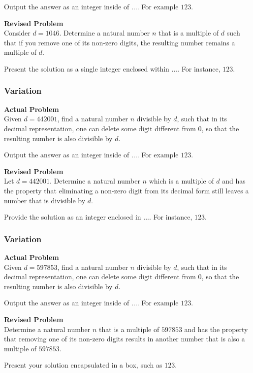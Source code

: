 Output the answer as an integer inside of $\boxed{...}$. For example $\boxed{123}$.

\textbf{Revised Problem}\\
Consider $d = 1046$. Determine a natural number $n$ that is a multiple of $d$ such that if you remove one of its non-zero digits, the resulting number remains a multiple of $d$.

Present the solution as a single integer enclosed within $\boxed{...}$. For instance, $\boxed{123}$.

\subsubsection{Variation}
\textbf{Actual Problem}\\
Given $d = 442001$, find a natural number $n$ divisible by $d$, such that in its decimal representation, one can delete some digit different from $0$, so that the resulting number is also divisible by $d$.

Output the answer as an integer inside of $\boxed{...}$. For example $\boxed{123}$.

\textbf{Revised Problem}\\
Let $d = 442001$. Determine a natural number $n$ which is a multiple of $d$ and has the property that eliminating a non-zero digit from its decimal form still leaves a number that is divisible by $d$.

Provide the solution as an integer enclosed in $\boxed{...}$. For instance, $\boxed{123}$.

\subsubsection{Variation}
\textbf{Actual Problem}\\
Given $d = 597853$, find a natural number $n$ divisible by $d$, such that in its decimal representation, one can delete some digit different from $0$, so that the resulting number is also divisible by $d$.

Output the answer as an integer inside of $\boxed{...}$. For example $\boxed{123}$.

\textbf{Revised Problem}\\
Determine a natural number \( n \) that is a multiple of \( 597853 \) and has the property that removing one of its non-zero digits results in another number that is also a multiple of \( 597853 \).

Present your solution encapsulated in a box, such as \(\boxed{123}\).


